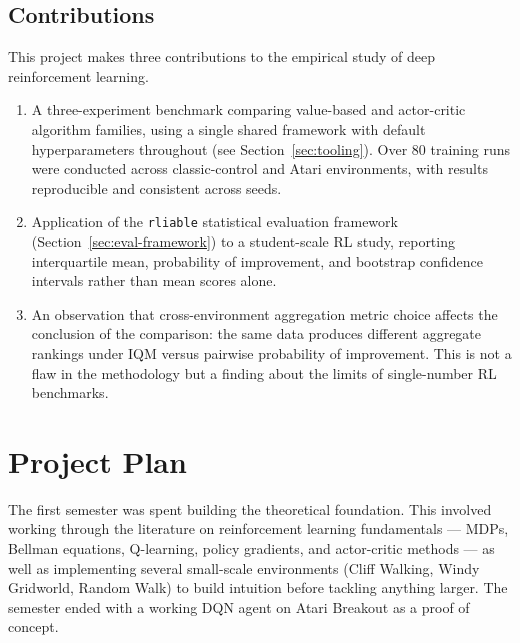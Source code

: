 \subsection{Contributions}

{\color{red} 
This project makes three contributions to the empirical study of deep reinforcement learning.

\begin{enumerate}
\item A three-experiment benchmark comparing value-based and actor-critic algorithm families, using a single shared framework with default hyperparameters throughout (see Section~\ref{sec:tooling}). Over 80 training runs were conducted across classic-control and Atari environments, with results reproducible and consistent across seeds.

\item Application of the \texttt{rliable} statistical evaluation framework (Section~\ref{sec:eval-framework}) to a student-scale RL study, reporting interquartile mean, probability of improvement, and bootstrap confidence intervals rather than mean scores alone.

\item An observation that cross-environment aggregation metric choice affects the conclusion of the comparison: the same data produces different aggregate rankings under IQM versus pairwise probability of improvement. This is not a flaw in the methodology but a finding about the limits of single-number RL benchmarks.
\end{enumerate}
}





















\section{Project Plan}

The first semester was spent building the theoretical foundation. This involved working through the literature on reinforcement learning fundamentals --- MDPs, Bellman equations, Q-learning, policy gradients, and actor-critic methods --- as well as implementing several small-scale environments (Cliff Walking, Windy Gridworld, Random Walk) to build intuition before tackling anything larger. The semester ended with a working DQN agent on Atari Breakout as a proof of concept.

